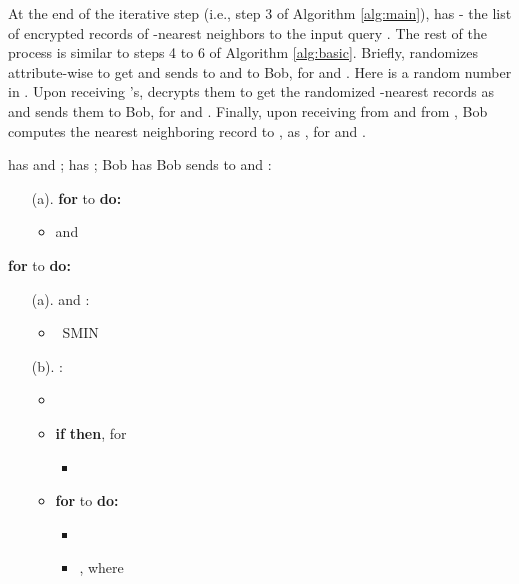 \documentclass{article}
\begin{document}
At the end of the iterative step (i.e., step 3 of Algorithm \ref{alg:main}), 
 has  - the list of encrypted 
records of -nearest neighbors to the input query . The rest of the process is similar to 
steps 4 to 6 of Algorithm \ref{alg:basic}. Briefly,  randomizes  attribute-wise 
to get  and sends  to  and  to Bob, 
for  and . 
Here  is a random number in . Upon receiving 's,  decrypts 
them to get the randomized -nearest records as  and sends them to Bob, for  and . 
Finally, upon receiving  from  and  from , 
Bob computes the  nearest 
neighboring record to , as , for  and .
\begin{algorithm}[!htbp]
\begin{algorithmic}[1]
\REQUIRE  has  and ;  has ; Bob has 
\STATE  Bob sends  to 
\STATE  and :
\begin{enumerate}\itemsep=-1pt
\item[(a).] \textbf{for}  to  \textbf{do:}
               \begin{itemize}
                      \item  and                       
               \end{itemize}         
\end{enumerate}
\STATE \textbf{for}  to  \textbf{do:}
\begin{enumerate}\itemsep=-1pt
    \item[(a).]  and :                            
              \begin{itemize}               
               \item ~SMIN   
              \end{itemize}  
    \item[(b).] :
              \begin{itemize}\itemsep=-1pt
                \item 
                \item \textbf{if}  \textbf{then}, for 
                \begin{itemize}       
                    \item   
                \end{itemize}      
                \item \textbf{for}  to  \textbf{do:}     
                \begin{itemize}\itemsep=0pt                                 
                    \item 
                    \item , where 
                \end{itemize}  

\end{itemize}
\end{enumerate}
\end{algorithmic}
\end{algorithm}
\end{document}
